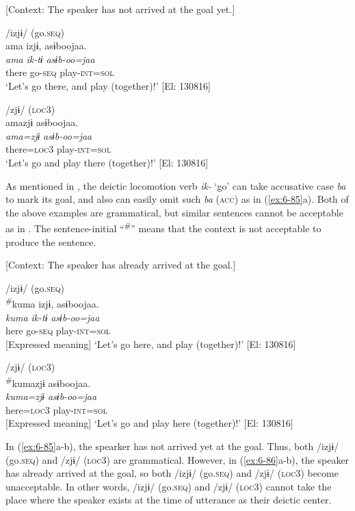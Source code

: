 \ea\label{ex:6-85}
  [Context: The speaker has not arrived at the goal yet.]

 \ea /izjɨ/ (go.\textsc{seq})\\
{\TM}
\glll  ama  izjɨ,  asɨboojaa.\\
\textit{ama}  \textit{ik-tɨ}  \textit{asɨb-oo=jaa}\\
there  go-\textsc{seq}  play-\textsc{int}=\textsc{sol}\\
\glt ‘Let’s go there, and play (together)!’ [El: 130816]

\ex /zjɨ/ (\textsc{loc3})\\
{\TM}
\glll  amazjɨ  asɨboojaa.\\
\textit{ama=zjɨ}  \textit{asɨb-oo=jaa}\\
there=\textsc{loc3}  play-\textsc{int}=\textsc{sol}\\
\glt ‘Let’s go and play there (together)!’ [El: 130816]
\z
\z

As mentioned in , the deictic locomotion verb \textit{ik-} ‘go’ can take accusative case \textit{ba} to mark its goal, and also can easily omit such \textit{ba} (\textsc{acc}) as in (\ref{ex:6-85}a). Both of the above examples are grammatical, but similar sentences cannot be acceptable as in . The sentence-initial “\textsuperscript{\#}” means that the context is not acceptable to produce the sentence.

\ea\label{ex:6-86}
  [Context: The speaker has already arrived at the goal.]

 \ea /izjɨ/ (go.\textsc{seq})\\
{\TM}
\glll  \textsuperscript{\#}kuma  izjɨ,  asɨboojaa.\\
\textit{kuma}  \textit{ik-tɨ}  \textit{asɨb-oo=jaa}\\
here  go-\textsc{seq}  play-\textsc{int}=\textsc{sol}\\
{}[Expressed meaning] ‘Let’s go here, and play (together)!’ [El: 130816]

\ex /zjɨ/ (\textsc{loc3})\\
{\TM}
\glll  \textsuperscript{\#}kumazjɨ  asɨboojaa.\\
\textit{kuma=zjɨ}  \textit{asɨb-oo=jaa}\\
here=\textsc{loc3}  play-\textsc{int}=\textsc{sol}\\
{}    [Expressed meaning] ‘Let’s go and play here (together)!’ [El: 130816]
\z
\z

In (\ref{ex:6-85}a-b), the spearker has not arrived yet at the goal. Thus, both /izjɨ/ (go.\textsc{seq}) and /zjɨ/ (\textsc{loc3}) are grammatical. However, in (\ref{ex:6-86}a-b), the speaker has already arrived at the goal, so both /izjɨ/ (go.\textsc{seq}) and /zjɨ/ (\textsc{loc3}) become unacceptable. In other words, /izjɨ/ (go.\textsc{seq}) and /zjɨ/ (\textsc{loc3}) cannot take the place where the speaker exists at the time of utterance as their deictic center.

